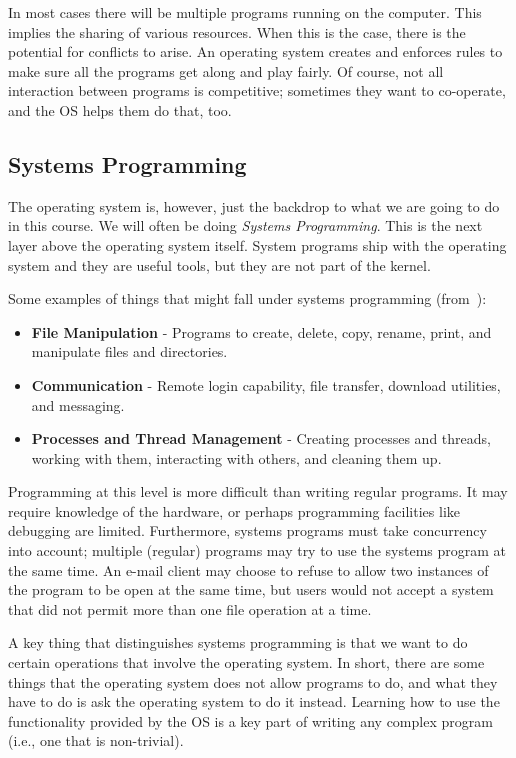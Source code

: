 \documentclass[a4paper]{report}
\begin{document}
In most cases there will be multiple programs running on the computer. This implies the sharing of various resources. When this is the case, there is the potential for conflicts to arise. An operating system creates and enforces rules to make sure all the programs get along and play fairly. Of course, not all interaction between programs is competitive; sometimes they want to co-operate, and the OS helps them do that, too.


\subsection*{Systems Programming}
The operating system is, however, just the backdrop to what we are going to do in this course. We will often be doing \textit{Systems Programming}. This is the next layer above the operating system itself. System programs ship with the operating system and they are useful tools, but they are not part of the kernel.

Some examples of things that might fall under systems programming (from~\cite{osc}):

\begin{itemize}
	\item \textbf{File Manipulation} - Programs to create, delete, copy, rename, print, and manipulate files and directories.
	\item \textbf{Communication} - Remote login capability, file transfer, download utilities, and messaging.
	\item \textbf{Processes and Thread Management} - Creating processes and threads, working with them, interacting with others, and cleaning them up.
\end{itemize}

Programming at this level is more difficult than writing regular programs. It may require knowledge of the hardware, or perhaps programming facilities like debugging are limited. Furthermore, systems programs must take concurrency into account; multiple (regular) programs may try to use the systems program at the same time. An e-mail client may choose to refuse to allow two instances of the program to be open at the same time, but users would not accept a system that did not permit more than one file operation at a time.

A key thing that distinguishes systems programming is that we want to do certain operations that involve the operating system. In short, there are some things that the operating system does not allow programs to do, and what they have to do is ask the operating system to do it instead. Learning how to use the functionality provided by the OS is a key part of writing any complex program (i.e., one that is non-trivial).
\end{document}
